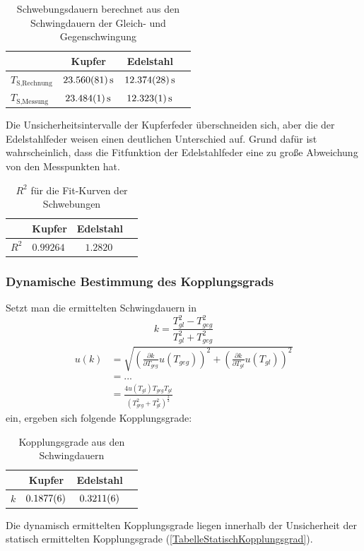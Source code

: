 \documentclass[
	a4paper,
	12pt,
	pagesize,
	ngerman
]{scrartcl}
\begin{document}
	\begin{table}[H]
	\centering
	\begin{tabular}{ l | c | c | c |}
		& Kupfer & Edelstahl  \\ \hline
		$T_\text{S,Rechnung}$ &$\SI{23,560 \pm 0,081}{s}$&$\SI{12,374 \pm 0,028}{s}$\\  \hline
		$T_\text{S,Messung} $ &$\SI{23,484 \pm 0,001}{s}$&$\SI{12,323 \pm 0,001}{s}$\\  \hline
	\end{tabular}
	\caption{Schwebungsdauern berechnet aus den Schwingdauern der Gleich- und Gegenschwingung}
	\end{table}
	Die Unsicherheitsintervalle der Kupferfeder überschneiden sich, aber die der Edelstahlfeder weisen einen deutlichen Unterschied auf. Grund dafür ist wahrscheinlich, dass die Fitfunktion der Edelstahlfeder eine zu große Abweichung von den Messpunkten hat.
	\begin{table}[H]
	\centering
	\begin{tabular}{ l | c | c | c |}
		& Kupfer & Edelstahl  \\ \hline
		$R^2$ &$\SI{0,99264}{}$&$\SI{1,2820}{}$\\  \hline
	\end{tabular}
	\caption{$R^2$ für die Fit-Kurven der Schwebungen}
	\end{table}

	\subsubsection{Dynamische Bestimmung des Kopplungsgrads}
	Setzt man die ermittelten Schwingdauern in
	\begin{equation}
		k = \frac{T_{gl}^2-T_{geg}^2}{T_{gl}^2+T_{geg}^2}
	\end{equation}
	\begin{align}
		u(k) &= \sqrt{\left(\frac{\partial k}{\partial T_{geg}}u(T_{geg}) \right)^2 + \left(\frac{\partial k}{\partial T_{gl}}u(T_{gl}) \right)^2 } \\
		&=                         ...\\
		&= \frac{4u(T_{gl})T_{geg}T_{gl}}{(T_{geg}^2+T_{gl}^2)^\frac{3}{2}}
	\end{align}
	ein, ergeben sich folgende Kopplungsgrade:
	\begin{table}[H]
	\centering
	\begin{tabular}{ l | c | c | c |}
		& Kupfer & Edelstahl  \\ \hline
		$k$ &$\SI{0,1877 \pm 0,0006}{}$&$\SI{0,3211 \pm 0,0006}{}$\\  \hline
	\end{tabular}
	\caption{Kopplungsgrade aus den Schwingdauern}
	\end{table}
	\noindent{}Die dynamisch ermittelten Kopplungsgrade liegen innerhalb der Unsicherheit der statisch ermittelten Kopplungsgrade (\cref{TabelleStatischKopplungsgrad}).
\end{document}
